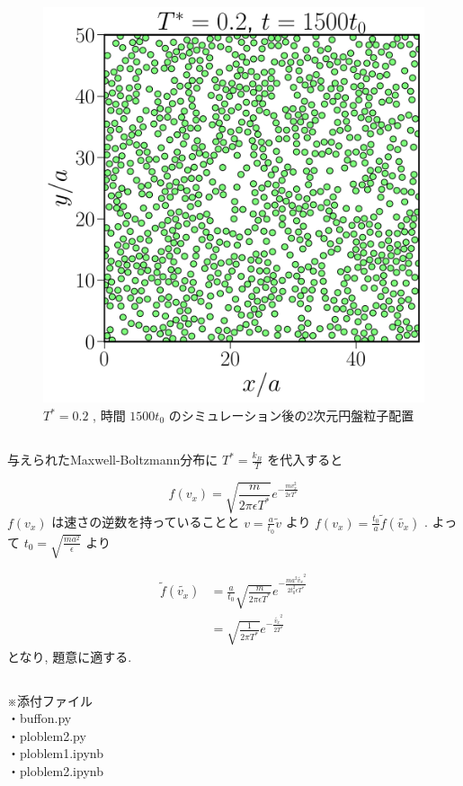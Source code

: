 \documentclass[a4paper,dvipdfmx]{jarticle}
\begin{document}
\begin{figure}[H]
    \centering
    \includegraphics[scale=0.6]{problem_2/2-3/problem2-3.pdf}
    \caption{$T^*=0.2$ , 時間 $1500t_0$ のシミュレーション後の2次元円盤粒子配置}
\end{figure}


\subsection{}
\noindent

\subsection{}
\noindent
与えられたMaxwell-Boltzmann分布に $T^*=\frac{k_B}{T}$ を代入すると

\begin{equation}
    f(v_x) = \sqrt{\frac{m}{2\pi \epsilon T^*}}e^{-\frac{mv_x^2}{2\epsilon T^*}} \tag{2.7}
\end{equation}
$f(v_x)$ は速さの逆数を持っていることと $v=\frac{a}{t_0}\tilde{v}$ より
$f(v_x)=\frac{t_0}{a} \tilde{f}(\tilde{v_x})$ . 
よって $t_0=\sqrt{\frac{ma^2}{\epsilon}}$ より

\begin{align*}
    \tilde{f}(\tilde{v_x}) &= \frac{a}{t_0}\sqrt{\frac{m}{2\pi \epsilon T^*}}e^{-\frac{ma^2\tilde{v_x}^2}{2t_0^2\epsilon T^*}} \\
    &= \sqrt{\frac{1}{2\pi T^*}}e^{-\frac{\tilde{v_x}^2}{2T^*}} \tag{2.8}
\end{align*}
となり, 題意に適する.

\subsection{}
\noindent

\newpage
\noindent
※添付ファイル \\
・buffon.py \\
・ploblem2.py \\
・ploblem1.ipynb \\
・ploblem2.ipynb
\end{document}

